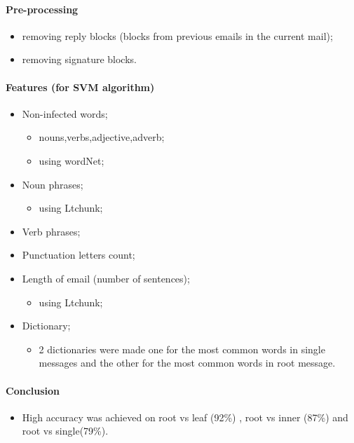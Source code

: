 \documentclass[12pt]{article}
\begin{document}
\paragraph{Pre-processing}
\begin{itemize}
    \item removing reply blocks (blocks from previous emails in the current mail);
    \item removing signature blocks.
\end{itemize}

\paragraph{Features (for SVM algorithm)}
\begin{itemize}
    \item Non-infected words;
    \begin{itemize}
        \item nouns,verbs,adjective,adverb;
        \item using wordNet;
    \end{itemize}
    \item Noun phrases;
    \begin{itemize}
        \item using Ltchunk;
    \end{itemize}
    \item Verb phrases;
    \item Punctuation letters count;
    \item Length of email (number of sentences);
    \begin{itemize}
        \item using Ltchunk;
    \end{itemize}
    \item Dictionary;
    \begin{itemize}
        \item 2 dictionaries were made one for the most common words in single messages and the other for the most common words in root message.
    \end{itemize}
\end{itemize}

\paragraph{Conclusion}
\begin{itemize}
    \item High accuracy was achieved on root vs leaf (92\%) , root vs inner (87\%) and root vs single(79\%).
\end{itemize}
\end{document}

